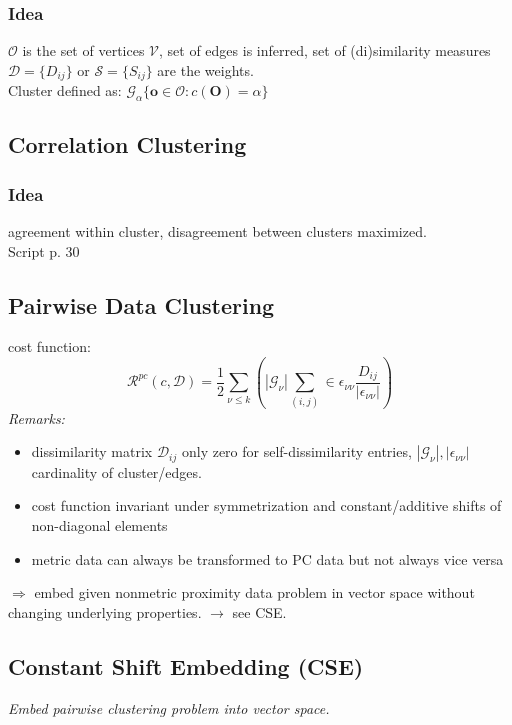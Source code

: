 \documentclass[9pt,parskip]{scrartcl}
\begin{document}
\begin{multicols*}{4}
\subsubsection*{Idea}
$\mathcal{O}$ is the set of vertices $\mathcal{V}$, set of edges is inferred, set of (di)similarity measures $\mathcal{D}=\{D_{ij}\}$ or $\mathcal{S}=\{S_{ij}\}$ are the weights. \\
Cluster defined as: $\mathcal{G}_{\alpha} \{ \mathbf{o} \in \mathcal{O} : c( \mathbf{O}) = \alpha\}$
\subsection*{Correlation Clustering}
\subsubsection*{Idea}
agreement within cluster, disagreement between clusters maximized. \\
Script p. 30
\subsection*{Pairwise Data Clustering}
cost function: 
\[\mathcal{R}^{pc}(c, \mathcal{D}) = \frac 1 2 \sum_{\nu \leq k} \left( |\mathcal{G}_{\nu}| \sum_{(i,j)} \in \epsilon_{\nu \nu} \frac{D_{ij}}{|\epsilon_{\nu \nu}|} \right) \]
\textit{Remarks:} 
\begin{itemize}
	\item dissimilarity matrix $\mathcal{D}_{ij}$ only zero for self-dissimilarity entries, $|\mathcal{G}_{\nu}|, |\epsilon_{\nu \nu}|$ cardinality of cluster/edges. 
	\item cost function invariant under symmetrization and constant/additive shifts of non-diagonal elements
	\item metric data can always be transformed to PC data but not always vice versa
\end{itemize}
$ \Rightarrow $ embed given nonmetric proximity data problem in vector space without changing underlying properties. $\rightarrow$ see CSE.
\subsection*{Constant Shift Embedding (CSE)}
\textit{Embed pairwise clustering problem into vector space.}

\end{multicols*}
\end{document}
